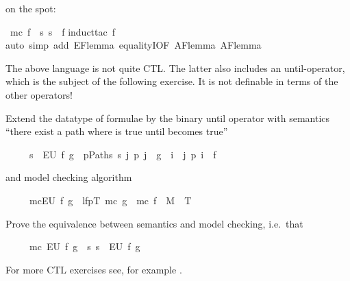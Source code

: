 \begin{isabellebody}
\begin{isamarkuptext}
on the spot:%
\end{isamarkuptext}%
\ {\isachardoublequote}mc\ f\ {\isacharequal}\ {\isacharbraceleft}s{\isachardot}\ s\ {\isasymTurnstile}\ f{\isacharbraceright}{\isachardoublequote}\isanewline
{}induct{\isacharunderscore}tac\ f{\isacharparenright}\isanewline
{}auto\ simp\ add{\isacharcolon}\ EF{\isacharunderscore}lemma\ equalityI{\isacharbrackleft}OF\ AF{\isacharunderscore}lemma{}\ AF{\isacharunderscore}lemma{}{\isacharbrackright}{\isacharparenright}\isanewline
{}%
\begin{isamarkuptext}%
The above language is not quite CTL. The latter also includes an
until-operator, which is the subject of the following exercise.
It is not definable in terms of the other operators!
\begin{exercise}
Extend the datatype of formulae by the binary until operator  with semantics
``there exist a path where  is true until  becomes true''
\begin{isabelle}%
\ \ \ \ \ s\ {\isasymTurnstile}\ EU\ f\ g\ {\isacharequal}\ {\isacharparenleft}{\isasymexists}p{\isasymin}Paths\ s{\isachardot}\ {\isasymexists}j{\isachardot}\ p\ j\ {\isasymTurnstile}\ g\ {\isasymand}\ {\isacharparenleft}{\isasymexists}i\ {\isacharless}\ j{\isachardot}\ p\ i\ {\isasymTurnstile}\ f{\isacharparenright}{\isacharparenright}%
\end{isabelle}
and model checking algorithm
\begin{isabelle}%
\ \ \ \ \ mc{\isacharparenleft}EU\ f\ g{\isacharparenright}\ {\isacharequal}\ lfp{\isacharparenleft}{\isasymlambda}T{\isachardot}\ mc\ g\ {\isasymunion}\ mc\ f\ {\isasyminter}\ {\isacharparenleft}M{\isacharcircum}{\isacharminus}{}\ {\isacharcircum}{\isacharcircum}\ T{\isacharparenright}{\isacharparenright}%
\end{isabelle}
Prove the equivalence between semantics and model checking, i.e.\ that
\begin{isabelle}%
\ \ \ \ \ mc\ {\isacharparenleft}EU\ f\ g{\isacharparenright}\ {\isacharequal}\ {\isacharbraceleft}s{\isachardot}\ s\ {\isasymTurnstile}\ EU\ f\ g{\isacharbraceright}%
\end{isabelle}
\end{exercise}
For more CTL exercises see, for example \cite{Huth-Ryan-book}.
\bigskip


\end{isamarkuptext}
\end{isabellebody}
